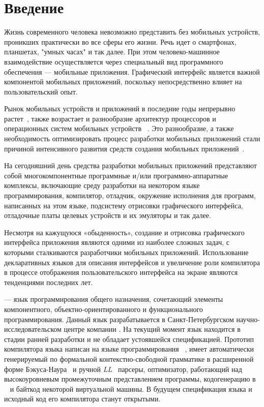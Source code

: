 \section*{Введение}
Жизнь современного человека невозможно представить без мобильных
устройств, проникших практически во все сферы его жизни. Речь идет о
смартфонах, планшетах, "умных часах" и так далее. При этом человеко-машинное
взаимодействие осуществляется через специальный вид программного обеспечения
--- мобильные приложения. Графический интерфейс является важной компонентой
мобильных приложений, поскольку непосредственно влияет на пользовательский
опыт.

Рынок мобильных устройств и приложений в последние годы непрерывно
растет~\cite{device-market-stat}, также возрастает и разнообразие архитектур
процессоров и операционных систем мобильных устройств ~\cite{cpu-arches, mobile-phones-cpu-trends}.
Это разнообразие, а также необходимость оптимизировать процесс разработки мобильных приложений стали причиной интенсивного развития средств создания
мобильных приложений~\cite{mob-apps-approaches,kotlin-homepage,swiftui-homepage,flutter-homepage, reactnative-homepage, vuenative-homepage}.

На сегодняшний день средства разработки мобильных приложений представляют
собой многокомпонентные программные и/или программно-аппаратные комплексы,
включающие среду разработки на некотором языке программирования, компилятор,
отладчик, окружение исполнения для программ, написанных на этом языке,
подсистему отрисовки графического интерфейса, отладочные платы целевых
устройств и их эмуляторы и так далее.

Несмотря на кажущуюся «обыденность», создание и отрисовка графического
интерфейса приложения являются одними из наиболее сложных задач, с которыми
сталкиваются разработчики мобильных приложений. Использование декларативных
языков для описания интерфейсов и увеличение роли компилятора в процессе
отображения пользовательского интерфейса на экране являются тенденциями
последних лет.

 --- язык программирования общего назначения, сочетающий
элементы компонентного, объектно-ориентированного и функционального
программирования. Данный язык разрабатывается в Санкт-Петербургском
научно-исследовательском центре компании . На текущий момент
язык находится в стадии ранней разработки и не обладает устоявшейся спецификацией. Прототип компилятора языка  написан на языке
программирования ~\cite{golang-homepage}, имеет автоматически
генерируемый по формальной контекстно-свободной грамматике в расширенной
форме Бэкуса-Наура~\cite{ebnf} и ручной \textit{LL}~\cite{llk-parsers}
парсеры, оптимизатор, работающий над высокоуровневым промежуточным
представлением программы, кодогенерацию в
~\cite{llvmir-homepage} и байткод некоторой виртуальной
машины. В будущем спецификация языка  и исходный код его
компилятора станут открытыми.

